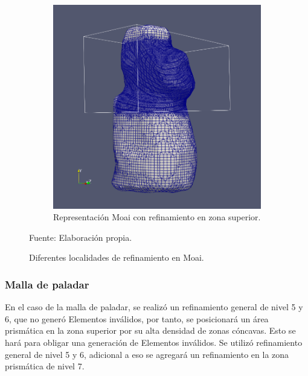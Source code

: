 \begin{figure}[!ht]
\begin{subfigure}[t]{0.45\textwidth}
        \includegraphics[width=1.0\textwidth]{figures/meshes/moai_5r7_2_01.png}
        \caption{ Representación Moai con refinamiento en zona superior. }
    \end{subfigure}
    \caption{ Diferentes localidades de refinamiento en Moai. }
    Fuente: Elaboración propia.
    \label{fig:moai_5r7_all}
\end{figure}

\subsubsection{Malla de paladar}


En el caso de la malla de paladar, se realizó un refinamiento general de nivel 5 y 6, que no generó Elementos inválidos, por tanto, se posicionará un área prismática en la zona superior por su alta densidad de zonas cóncavas.
Esto se hará para obligar una generación de Elementos inválidos. Se utilizó refinamiento general de nivel 5 y 6, adicional a eso se agregará un refinamiento en la zona prismática de nivel 7.


